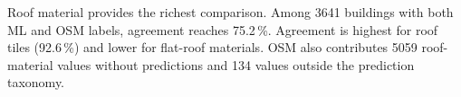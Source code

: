 \documentclass[sigconf,authordraft]{acmart}
\begin{document}
Roof material provides the richest comparison.
Among \num{3641} buildings with both ML and OSM labels, agreement reaches 75.2\,\%.
Agreement is highest for roof tiles (92.6\,\%) and lower for flat-roof materials.
OSM also contributes \num{5059} roof-material values without predictions and 134 values outside the prediction taxonomy.
%
%
\end{document}
